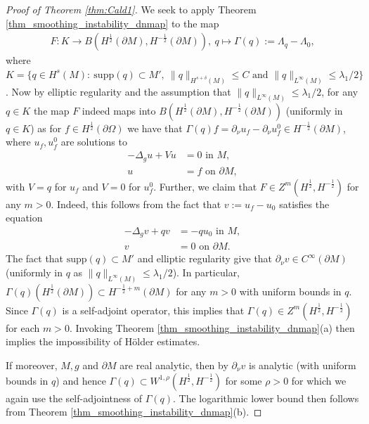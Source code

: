 \documentclass[12pt,twoside]{amsart}
\numberwithin{equation}{section}
\renewcommand{\leq}{\leqslant}
\newcommand {\p} {\partial}
\newcommand {\D} {\Delta}
\newcommand{\supp}{\mathrm{supp}}
\begin{document}
\begin{proof}[Proof of Theorem \ref{thm:Cald1}]
We seek to apply Theorem \ref{thm_smoothing_instability_dnmap} to the map 
\begin{align*}
F: K \rightarrow B(H^{\frac{1}{2}}(\partial M), H^{-\frac{1}{2}}(\partial M)), \ q \mapsto \Gamma(q):= \Lambda_{q}-\Lambda_{0},
\end{align*}
where $K = \{q \in H^{s}(M): \ \supp(q) \subset M', \ \|q\|_{H^{s+\delta}(M)} \leq C \mbox{ and } \|q\|_{L^{\infty}(M)}\leq \lambda_1/2\}$.
Now by elliptic regularity and the assumption that $\|q\|_{L^{\infty}(M)} \leq \lambda_1/2$, for any $q \in K$ the map $F$ indeed maps into $B(H^{\frac{1}{2}}(\partial M), H^{-\frac{1}{2}}(\partial M))$ (uniformly in $q \in K$) as for $f\in H^{\frac{1}{2}}(\partial \Omega)$ we have that $\Gamma(q)f = \p_{\nu} u_f - \p_{\nu} u_f^0 \in H^{-\frac{1}{2}}(\partial M)$, where $u_f, u_f^0$ are solutions to 
\begin{align*}
-\D_g u + V u &= 0 \mbox{ in } M,\\
u & = f \mbox{ on } \partial M,
\end{align*}
with $V= q$ for $u_f$ and $V=0$ for $u_f^0$. Further, we claim that $F \in Z^m(H^{\frac{1}{2}}, H^{-\frac{1}{2}})$ for any $m>0$. Indeed, this follows from the fact that $v:=u_f-u_0$ satisfies the equation
\begin{align*}
-\D_g v + q v &= -q u_0 \mbox{ in } M,\\
v & = 0 \mbox{ on } \partial M.
\end{align*}
The fact that $\supp(q) \subset M'$ and elliptic regularity give that $\partial_{\nu} v \in C^{\infty}(\partial M)$ (uniformly in $q$ as $\|q\|_{L^{\infty}(M)}\leq \lambda_1/2$). In particular, $\Gamma(q) (H^{\frac{1}{2}}(\partial M)) \subset H^{-\frac{1}{2}+m}(\partial M)$ for any $m >0$ with uniform bounds in $q$. Since $\Gamma(q)$ is a self-adjoint operator, this implies that $\Gamma(q)\in Z^m(H^{\frac{1}{2}},H^{- \frac{1}{2}})$ for each $m>0$. Invoking Theorem \ref{thm_smoothing_instability_dnmap}(a) then implies the impossibility of H{\"o}lder estimates.

If moreover, $M,g$ and $\partial M$ are real analytic, then by \cite[Theorem 1.2 in Chapter 8 of vol. III]{LionsMagenes} $\partial_{\nu} v$ is analytic  (with uniform bounds in $q$) and hence $\Gamma(q) \subset W^{1,\rho}(H^{\frac{1}{2}}, H^{-\frac{1}{2}})$ for some $\rho >0$ for which we again use the self-adjointness of $\Gamma(q)$. The logarithmic lower bound then follows from Theorem \ref{thm_smoothing_instability_dnmap}(b).
\end{proof}
\end{document}
